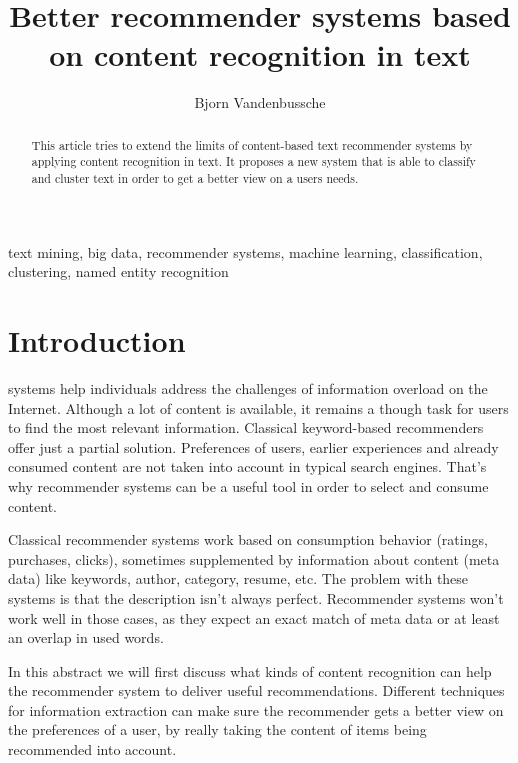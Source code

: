 \documentclass[twocolumn]{phdsymp} %
\begin{document}
\title{Better recommender systems based on content recognition in text} %

\author{Bjorn Vandenbussche}


\maketitle

\begin{abstract}
This article tries to extend the limits of content-based text recommender systems by applying content recognition in text. It proposes a new system that is able to classify and cluster text in order to get a better view on a users needs. 
\end{abstract}

\begin{keywords}
text mining, big data, recommender systems, machine learning, classification, clustering, named entity recognition

\end{keywords}

\section{Introduction}
 systems help individuals address the challenges of information overload on the Internet. Although a lot of content is available, it remains a though task for users to find the most relevant information.
Classical keyword-based recommenders offer just a partial solution. Preferences of users, earlier experiences and already consumed content are not taken into account in typical search engines. That's why recommender systems can be a useful tool in order to select and consume content.  

Classical recommender systems work based on consumption behavior (ratings, purchases, clicks), sometimes supplemented by information about content (meta data) like keywords, author, category, resume, etc. The problem with these systems is that the description isn't always perfect. Recommender systems won't work well in those cases, as they expect an exact match of meta data or at least an overlap in used words.

In this abstract we will first discuss what kinds of content recognition can help the recommender system to deliver useful recommendations. Different techniques for information extraction can make sure the recommender gets a better view on the preferences of a user, by really taking the content of items being recommended into account. 
\end{document}
